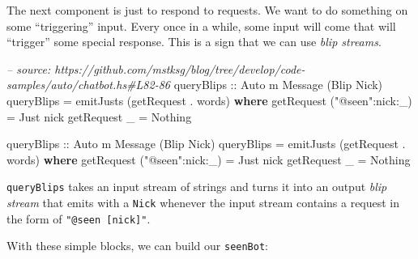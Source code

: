 \documentclass[]{article}
\newenvironment{Shaded}{}{}
\newcommand{\KeywordTok}[1]{\textcolor[rgb]{0.00,0.44,0.13}{\textbf{{#1}}}}
\newcommand{\DataTypeTok}[1]{\textcolor[rgb]{0.56,0.13,0.00}{{#1}}}
\newcommand{\StringTok}[1]{\textcolor[rgb]{0.25,0.44,0.63}{{#1}}}
\newcommand{\CommentTok}[1]{\textcolor[rgb]{0.38,0.63,0.69}{\textit{{#1}}}}
\newcommand{\OtherTok}[1]{\textcolor[rgb]{0.00,0.44,0.13}{{#1}}}
\newcommand{\FunctionTok}[1]{\textcolor[rgb]{0.02,0.16,0.49}{{#1}}}
\newcommand{\NormalTok}[1]{{#1}}
\begin{document}
The next component is just to respond to requests. We want to do something on some ``triggering''
input. Every once in a while, some input will come that will ``trigger'' some special response. This
is a sign that we can use \emph{blip streams}.

\begin{Shaded}
\begin{Highlighting}[]
\CommentTok{-- source: https://github.com/mstksg/blog/tree/develop/code-samples/auto/chatbot.hs#L82-86}
\OtherTok{    queryBlips ::} \DataTypeTok{Auto} \NormalTok{m }\DataTypeTok{Message} \NormalTok{(}\DataTypeTok{Blip} \DataTypeTok{Nick}\NormalTok{)}
    \NormalTok{queryBlips }\FunctionTok{=} \NormalTok{emitJusts (getRequest }\FunctionTok{.} \NormalTok{words)}
      \KeywordTok{where}
        \NormalTok{getRequest (}\StringTok{"@seen"}\FunctionTok{:}\NormalTok{nick}\FunctionTok{:}\NormalTok{_) }\FunctionTok{=} \DataTypeTok{Just} \NormalTok{nick}
        \NormalTok{getRequest _                }\FunctionTok{=} \DataTypeTok{Nothing}



\OtherTok{queryBlips ::} \DataTypeTok{Auto} \NormalTok{m }\DataTypeTok{Message} \NormalTok{(}\DataTypeTok{Blip} \DataTypeTok{Nick}\NormalTok{)}
\NormalTok{queryBlips }\FunctionTok{=} \NormalTok{emitJusts (getRequest }\FunctionTok{.} \NormalTok{words)}
  \KeywordTok{where}
    \NormalTok{getRequest (}\StringTok{"@seen"}\FunctionTok{:}\NormalTok{nick}\FunctionTok{:}\NormalTok{_) }\FunctionTok{=} \DataTypeTok{Just} \NormalTok{nick}
    \NormalTok{getRequest _                }\FunctionTok{=} \DataTypeTok{Nothing}
\end{Highlighting}
\end{Shaded}

\texttt{queryBlips} takes an input stream of strings and turns it into an output \emph{blip stream}
that emits with a \texttt{Nick} whenever the input stream contains a request in the form of
\texttt{"@seen\ {[}nick{]}"}.

With these simple blocks, we can build our \texttt{seenBot}:
\end{document}
